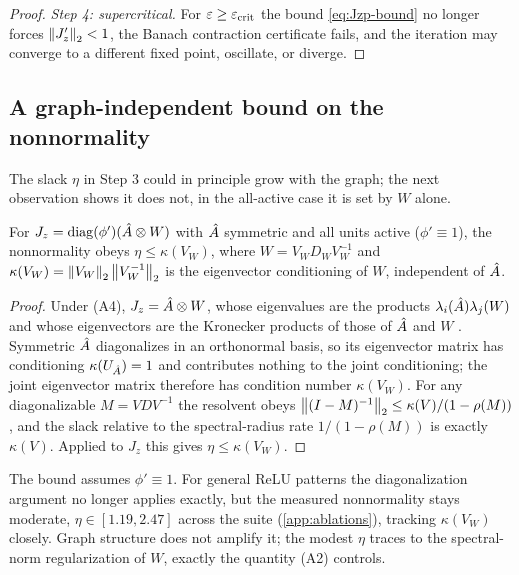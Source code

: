 \begin{proof}
\emph{Step 4: supercritical.}
For $\varepsilon\ge\varepsilon_{\mathrm{crit}}$ the bound \eqref{eq:Jzp-bound} no longer forces $\left\|J_z'\right\|_2<1$, the Banach
contraction certificate fails, and the iteration may converge to a different fixed point, oscillate, or
diverge.
\end{proof}

\subsection{A graph-independent bound on the nonnormality}
\label{app:proof_eta}

The slack $\eta$ in Step 3 could in principle grow with the graph; the next observation shows it does
not, in the all-active case it is set by $W$ alone.

\begin{observation}
\label{obs:eta_bound}
For $J_z=\operatorname{diag}(\phi')(\hat{A}\otimes W)$ with $\hat{A}$ symmetric and all units active ($\phi'\equiv1$), the
nonnormality obeys $\eta\le\kappa(V_W)$, where $W=V_W D_W V_W^{-1}$ and
$\kappa(V_W)=\left\|V_W\right\|_2\left\|V_W^{-1}\right\|_2$ is the eigenvector conditioning of $W$, independent of
$\hat{A}$.
\end{observation}

\begin{proof}
Under (A4), $J_z=\hat{A}\otimes W$, whose eigenvalues are the products $\lambda_i(\hat{A})\lambda_j(W)$ and
whose eigenvectors are the Kronecker products of those of $\hat{A}$ and $W$ \citep{stewart1990matrix}.
Symmetric $\hat{A}$ diagonalizes in an orthonormal basis, so its eigenvector matrix has conditioning
$\kappa(U_{\hat{A}})=1$ and contributes nothing to the joint conditioning; the joint eigenvector matrix
therefore has condition number $\kappa(V_W)$. For any diagonalizable $M=VDV^{-1}$ the resolvent obeys
$\left\|(I-M)^{-1}\right\|_2\le\kappa(V)/(1-\rho(M))$, and the slack relative to the spectral-radius rate
$1/(1-\rho(M))$ is exactly $\kappa(V)$. Applied to $J_z$ this gives $\eta\le\kappa(V_W)$.
\end{proof}

\begin{remark}
\label{rem:eta_relu}
The bound assumes $\phi'\equiv1$. For general ReLU patterns the diagonalization argument no longer
applies exactly, but the measured nonnormality stays moderate, $\eta\in[1.19,2.47]$ across the suite
(\cref{app:ablations}), tracking $\kappa(V_W)$ closely. Graph structure does not amplify it; the modest
$\eta$ traces to the spectral-norm regularization of $W$, exactly the quantity (A2) controls.
\end{remark}

